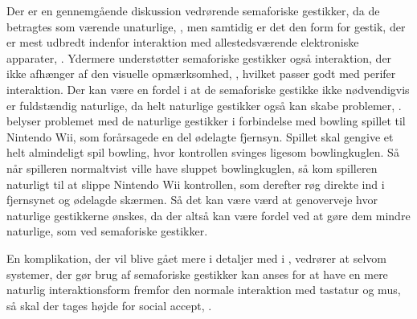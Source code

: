 Der er en gennemgående diskussion vedrørende semaforiske gestikker, da de betragtes som værende unaturlige, \parencite[s. 1961]{PDF:AStudyOnTheUseOfSemaphoricGestures}, men samtidig er det den form for gestik, der er mest udbredt indenfor interaktion med allestedsværende elektroniske apparater, \parencite[s. 28]{PDF:ATaxonomyOfGestures}. Ydermere understøtter semaforiske gestikker også interaktion, der ikke afhænger af den visuelle opmærksomhed, \parencite[s. 1964]{PDF:AStudyOnTheUseOfSemaphoricGestures}, hvilket passer godt med perifer interaktion. Der kan være en fordel i at de semaforiske gestikke ikke nødvendigvis er fuldstændig naturlige, da helt naturlige gestikker også kan skabe problemer, \parencite[s. 9]{PDF:NaturalUserInterfaces}. \textcite[s. 9]{PDF:NaturalUserInterfaces} belyser problemet med de naturlige gestikker i forbindelse med bowling spillet til Nintendo Wii, som forårsagede en del ødelagte fjernsyn. Spillet skal gengive et helt almindeligt spil bowling, hvor kontrollen svinges ligesom bowlingkuglen. Så når spilleren normaltvist ville have sluppet bowlingkuglen, så kom spilleren naturligt til at slippe Nintendo Wii kontrollen, som derefter røg direkte ind i fjernsynet og ødelagde skærmen. Så det kan være værd at genoverveje hvor naturlige gestikkerne ønskes, da der altså kan være fordel ved at gøre dem mindre naturlige, som ved semaforiske gestikker.

En komplikation, der vil blive gået mere i detaljer med i , vedrører at selvom systemer, der gør brug af semaforiske gestikker kan anses for at have en mere naturlig interaktionsform fremfor den normale interaktion med tastatur og mus, så skal der tages højde for social accept, \parencite[s. 275]{PDF:WouldYouDoThat}. 
%
